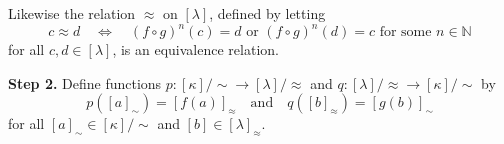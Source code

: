 \begin{cproof}

Likewise the relation $\approx$ on $[\lambda]$, defined by letting
\[ c \approx d \quad \Leftrightarrow \quad (f \circ g)^n(c) = d \text{ or } (f \circ g)^n(d) = c \text{ for some } n \in \mathbb{N} \]
for all $c,d \in [\lambda]$, is an equivalence relation.

\textbf{Step 2.} Define functions $p : [\kappa]/{\sim} \to [\lambda]/{\approx}$ and $q : [\lambda]/{\approx} \to [\kappa]/{\sim}$ by
\[ p([a]_{\sim}) = [f(a)]_{\approx} \quad \text{and} \quad q([b]_{\approx}) = [g(b)]_{\sim} \]
for all $[a]_{\sim} \in [\kappa]/{\sim}$ and $[b] \in [\lambda]_{\approx}$.


\end{cproof}
